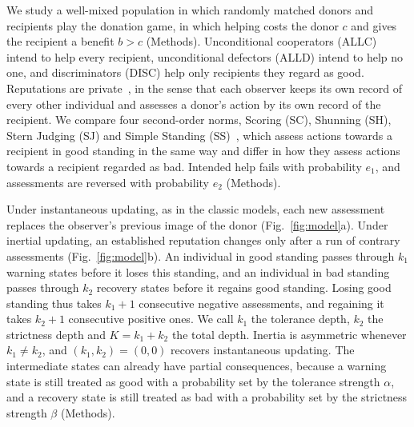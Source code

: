 \documentclass[10pt]{wlscirep}
\theoremstyle{plain}
\theoremstyle{remark}
\begin{document}
We study a well-mixed population in which randomly matched donors and recipients play the donation game, in which helping costs the donor $c$ and gives the recipient a benefit $b>c$ (Methods). Unconditional cooperators (ALLC) intend to help every recipient, unconditional defectors (ALLD) intend to help no one, and discriminators (DISC) help only recipients they regard as good. Reputations are private~\cite{hilbe2018,okada2018}, in the sense that each observer keeps its own record of every other individual and assesses a donor's action by its own record of the recipient. We compare four second-order norms, Scoring (SC), Shunning (SH), Stern Judging (SJ) and Simple Standing (SS)~\cite{ohtsuki2004,pacheco2006}, which assess actions towards a recipient in good standing in the same way and differ in how they assess actions towards a recipient regarded as bad. Intended help fails with probability $e_1$, and assessments are reversed with probability $e_2$ (Methods).

Under instantaneous updating, as in the classic models, each new assessment replaces the observer's previous image of the donor (Fig.~\ref{fig:model}a). Under inertial updating, an established reputation changes only after a run of contrary assessments (Fig.~\ref{fig:model}b). An individual in good standing passes through $k_1$ warning states before it loses this standing, and an individual in bad standing passes through $k_2$ recovery states before it regains good standing. Losing good standing thus takes $k_1+1$ consecutive negative assessments, and regaining it takes $k_2+1$ consecutive positive ones. We call $k_1$ the tolerance depth, $k_2$ the strictness depth and $K=k_1+k_2$ the total depth. Inertia is asymmetric whenever $k_1\neq k_2$, and $(k_1,k_2)=(0,0)$ recovers instantaneous updating. The intermediate states can already have partial consequences, because a warning state is still treated as good with a probability set by the tolerance strength $\alpha$, and a recovery state is still treated as bad with a probability set by the strictness strength $\beta$ (Methods).
\end{document}
